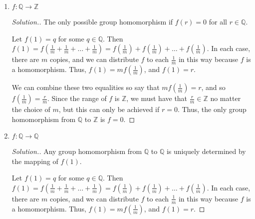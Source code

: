 \documentclass{article}
\newcommand{\sk}{\smallskip}
\newcommand{\Z}{\mathbb{Z}}
\newcommand{\Q}{\mathbb{Q}}
\begin{document}
\begin{enumerate}
\begin{enumerate}
\begin{proof}[Solution.]
            \sk

            This satisfies being a group homomorphism since $f(a+b) = q(a+b) = qa + qb = f(a) + f(b)$.

            \sk
            
            Thus, the set of all group homomorphisms from $\Z$ to $\Q$ can be denoted as $\{f_q : q \in \Q \}$, where $f_q(n) = qn$ for $n \in \Z$.
            
            \end{proof} 
        \item $f: \Q \rightarrow \Z$
            \begin{proof}[Solution.]
            The only possible group homomorphism if $f(r) = 0$ for all $r \in \Q$.

            \sk

            Let $f(1) = q$ for some $q \in \Q$. Then $f(1) = f\left(\frac{1}{m} + \frac{1}{m} + \dots + \frac{1}{m}\right) = f\left(\frac{1}{m}\right) + f\left(\frac{1}{m}\right) + \dots + f\left(\frac{1}{m}\right)$. In each case, there are $m$ copies, and we can distribute $f$ to each $\frac{1}{m}$ in this way because $f$ is a homomorphism. Thus, $f(1) = mf\left(\frac{1}{m}\right)$, and $f(1) = r$. 

            \sk

            We can combine these two equalities so say that $mf\left(\frac{1}{m}\right) = r$, and so $f\left(\frac{1}{m}\right) = \frac{r}{m}$. Since the range of $f$ is $\Z$, we must have that $\frac{r}{m} \in \Z$ no matter the choice of $m$, but this can only be achieved if $r = 0$. Thus, the only group homomorphism from $\Q$ to $\Z$ is $f = 0$.
            \end{proof}
            
        \item $f: \Q \rightarrow \Q$
            \begin{proof}[Solution.]
            Any group homomorphism from $\Q$ to $\Q$ is uniquely determined by the mapping of $f(1)$. 

            \sk

            Let $f(1) = q$ for some $q \in \Q$. Then $f(1) = f\left(\frac{1}{m} + \frac{1}{m} + \dots + \frac{1}{m}\right) = f\left(\frac{1}{m}\right) + f\left(\frac{1}{m}\right) + \dots + f\left(\frac{1}{m}\right)$. In each case, there are $m$ copies, and we can distribute $f$ to each $\frac{1}{m}$ in this way because $f$ is a homomorphism. Thus, $f(1) = mf\left(\frac{1}{m}\right)$, and $f(1) = r$.


\end{proof}
\end{enumerate}
\end{enumerate}
\end{document}

